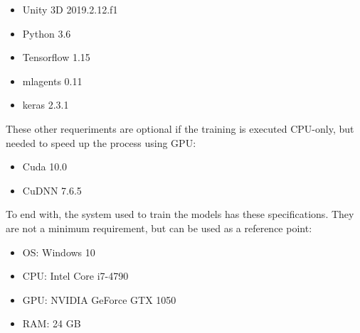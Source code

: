 \begin{itemize}
 \item Unity 3D 2019.2.12.f1
 \item Python 3.6
 \item Tensorflow 1.15
 \item mlagents 0.11
 \item keras 2.3.1
\end{itemize}

These other requeriments are optional if the training is executed CPU-only, but needed to speed up the process using GPU:

\begin{itemize}
 \item Cuda 10.0
 \item CuDNN 7.6.5
\end{itemize}

To end with, the system used to train the models has these specifications. They are not a minimum requirement, but can be used as a reference point:

\begin{itemize}
 \item OS: Windows 10
 \item CPU: Intel Core i7-4790
 \item GPU: NVIDIA GeForce GTX 1050
 \item RAM: 24 GB
\end{itemize}
